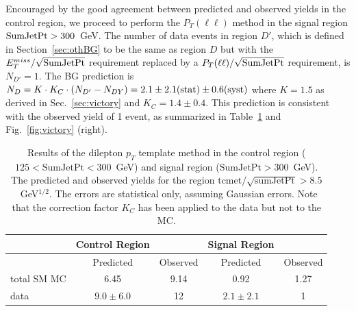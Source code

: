 Encouraged by the good agreement between predicted and observed yields
in the control region, we proceed to perform the $P_T(\ell \ell)$ method 
in the signal region ${\rm SumJetPt}>300$~GeV.
The number of data events in region $D'$, which is defined in 
Section~\ref{sec:othBG} to be the same as region $D$ but with the
$E_{T}^{miss}/\sqrt{\rm SumJetPt}$ requirement 
replaced by a $P_T(\ell\ell)/\sqrt{\rm SumJetPt}$ requirement,
is $N_{D'}=1$.  
The BG prediction is 
$N_D = K \cdot K_C \cdot (N_{D'}-N_{DY}) = 2.1 \pm 2.1({\rm stat}) \pm 0.6({\rm syst})$ 
where $K=1.5$ as derived in Sec.~\ref{sec:victory} and $K_C = 1.4 \pm 0.4$.
This prediction is consistent with the observed yield of 1 event, as summarized 
in Table~\ref{tab:victory} and Fig.~\ref{fig:victory} (right).




\begin{table}[hbt]
\begin{center}
\caption{\label{tab:victory}Results of the dilepton $p_{T}$ template method in the control region
($125 < \mathrm{SumJetPt} < 300$~GeV) and signal region ($\mathrm{SumJetPt} > 300$~GeV). The predicted and 
observed yields for the region $\mathrm{tcmet}/\sqrt{\mathrm{sumJetPt}} > 8.5$~GeV$^{1/2}$. The errors are
statistical only, assuming Gaussian errors. Note that the correction factor $K_C$ has been applied to
the data but not to the MC.  }
\begin{tabular}{l|cc|cc}
\hline
              &    Control Region   &                        &   Signal Region    &               \\
\hline
              & Predicted           &   Observed             &   Predicted        &  Observed     \\              
\hline
total SM   MC &      6.45           &       9.14             &   0.92             &  1.27         \\
         data &  $9.0 \pm 6.0$      &         12             &   $2.1 \pm 2.1$    &  1            \\
\hline
\end{tabular}
\end{center}
\end{table}



